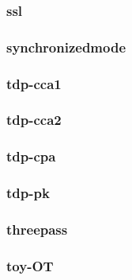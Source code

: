 \begin{frame}\frametitle{ssl}
\begin{figure}
\begin{center}

\end{center}
\end{figure}
\end{frame}
\begin{frame}\frametitle{synchronizedmode}
\begin{figure}
\begin{center}

\end{center}
\end{figure}
\end{frame}
\begin{frame}\frametitle{tdp-cca1}
\begin{figure}
\begin{center}

\end{center}
\end{figure}
\end{frame}
\begin{frame}\frametitle{tdp-cca2}
\begin{figure}
\begin{center}

\end{center}
\end{figure}
\end{frame}
\begin{frame}\frametitle{tdp-cpa}
\begin{figure}
\begin{center}

\end{center}
\end{figure}
\end{frame}
\begin{frame}\frametitle{tdp-pk}
\begin{figure}
\begin{center}

\end{center}
\end{figure}
\end{frame}
\begin{frame}\frametitle{threepass}
\begin{figure}
\begin{center}

\end{center}
\end{figure}
\end{frame}
\begin{frame}\frametitle{toy-OT}
\begin{figure}
\begin{center}

\end{center}
\end{figure}
\end{frame}
